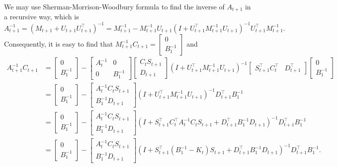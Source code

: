 We may use Sherman-Morrison-Woodbury formula to find the inverse of $A_{t+1}$ in a recursive way, which is 
\begin{equation}
A_{t+1}^{-1} = \left(M_{t+1}+U_{t+1}U_{t+1}^\top\right)^{-1}= M_{t+1}^{-1}-M_{t+1}^{-1}U_{t+1}\left(I+U_{t+1}^\top M_{t+1}^{-1}U_{t+1}\right)^{-1}U_{t+1}^\top M_{t+1}^{-1}.
\end{equation}
Consequently, it is easy to find that $M_{t+1}^{-1}C_{t+1} =\begin{bmatrix} 0 \\ B_1^{-1} \end{bmatrix} $ and 
\begin{align*}
A_{t+1}^{-1}C_{t+1} &= \begin{bmatrix} 0 \\ B_1^{-1} \end{bmatrix}  - \begin{bmatrix}
A_t^{-1} & 0 \\ 0 & B_1^{-1} \end{bmatrix} \begin{bmatrix} C_tS_{t+1} \\ D_{t+1} \end{bmatrix}
\left(I+U_{t+1}^\top M_{t+1}^{-1}U_{t+1}\right)^{-1}  \begin{bmatrix}
S_{t+1}^\top C_t^\top & D_{t+1}^\top \end{bmatrix} \begin{bmatrix} 0 \\ B_1^{-1} \end{bmatrix}  \\ 
& = \begin{bmatrix} 0 \\ B_1^{-1} \end{bmatrix}  - \begin{bmatrix}
A_t^{-1} C_tS_{t+1} \\B_1^{-1}D_{t+1} \end{bmatrix} 
\left(I+U_{t+1}^\top M_{t+1}^{-1}U_{t+1}\right)^{-1}  D_{t+1}^\top B_1^{-1} \\ 
& = \begin{bmatrix} 0 \\ B_1^{-1} \end{bmatrix}  - \begin{bmatrix}
A_t^{-1} C_tS_{t+1} \\B_1^{-1}D_{t+1} \end{bmatrix} 
\left(I+ S_{t+1}^\top C_t^\top A_t^{-1} C_t S_{t+1} +D_{t+1}^\top B_1^{-1}D_{t+1}  \right)^{-1}  D_{t+1}^\top B_1^{-1} \\ 
& = \begin{bmatrix} 0 \\ B_1^{-1} \end{bmatrix}  - \begin{bmatrix}
A_t^{-1} C_tS_{t+1} \\B_1^{-1}D_{t+1} \end{bmatrix} 
\left(I+ S_{t+1}^\top \left(B_1^{-1} - K_t\right)  S_{t+1} +D_{t+1}^\top B_1^{-1}D_{t+1}  \right)^{-1}  D_{t+1}^\top B_1^{-1}.
\end{align*}
